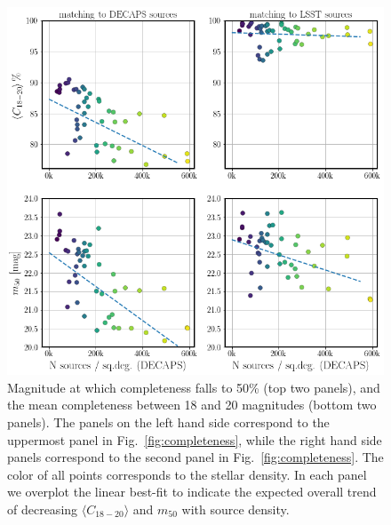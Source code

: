 \documentclass[DM,lsstdraft,toc,usenatbib]{lsstdoc}
\begin{document}
\begin{figure}
\begin{centering}
\includegraphics[width=0.96\columnwidth]{figs/decaps_lsst_c1820_m50.png}
\caption{Magnitude at which completeness falls to 50\% (top two panels), and the mean completeness between 18 and 20 magnitudes (bottom two panels).  The panels on the left hand side correspond to the uppermost panel in Fig.~\ref{fig:completeness}, while the right hand side panels correspond to the second panel in Fig.~\ref{fig:completeness}. The color of all points corresponds to the stellar density. In each panel we overplot the linear best-fit to indicate the expected overall trend of decreasing $\langle C_{18-20} \rangle$ and  $m_{50}$ with source density. }
\label{fig:completeness_characterize}
\end{centering}
\end{figure} 
\end{document}
